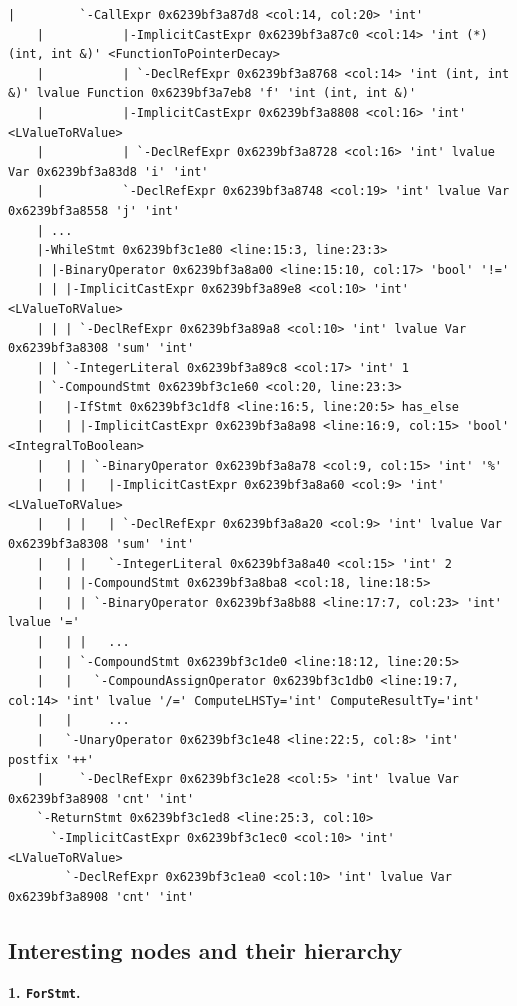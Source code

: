 \documentclass[11pt,a4paper]{article}
\begin{document}
\begin{Verbatim}[fontsize=\scriptsize, frame=single, breaklines, breakanywhere, breakindent=4em, breaksymbolleft={}]
    |         `-CallExpr 0x6239bf3a87d8 <col:14, col:20> 'int'
    |           |-ImplicitCastExpr 0x6239bf3a87c0 <col:14> 'int (*)(int, int &)' <FunctionToPointerDecay>
    |           | `-DeclRefExpr 0x6239bf3a8768 <col:14> 'int (int, int &)' lvalue Function 0x6239bf3a7eb8 'f' 'int (int, int &)'
    |           |-ImplicitCastExpr 0x6239bf3a8808 <col:16> 'int' <LValueToRValue>
    |           | `-DeclRefExpr 0x6239bf3a8728 <col:16> 'int' lvalue Var 0x6239bf3a83d8 'i' 'int'
    |           `-DeclRefExpr 0x6239bf3a8748 <col:19> 'int' lvalue Var 0x6239bf3a8558 'j' 'int'
    | ...
    |-WhileStmt 0x6239bf3c1e80 <line:15:3, line:23:3>
    | |-BinaryOperator 0x6239bf3a8a00 <line:15:10, col:17> 'bool' '!='
    | | |-ImplicitCastExpr 0x6239bf3a89e8 <col:10> 'int' <LValueToRValue>
    | | | `-DeclRefExpr 0x6239bf3a89a8 <col:10> 'int' lvalue Var 0x6239bf3a8308 'sum' 'int'
    | | `-IntegerLiteral 0x6239bf3a89c8 <col:17> 'int' 1
    | `-CompoundStmt 0x6239bf3c1e60 <col:20, line:23:3>
    |   |-IfStmt 0x6239bf3c1df8 <line:16:5, line:20:5> has_else
    |   | |-ImplicitCastExpr 0x6239bf3a8a98 <line:16:9, col:15> 'bool' <IntegralToBoolean>
    |   | | `-BinaryOperator 0x6239bf3a8a78 <col:9, col:15> 'int' '%'
    |   | |   |-ImplicitCastExpr 0x6239bf3a8a60 <col:9> 'int' <LValueToRValue>
    |   | |   | `-DeclRefExpr 0x6239bf3a8a20 <col:9> 'int' lvalue Var 0x6239bf3a8308 'sum' 'int'
    |   | |   `-IntegerLiteral 0x6239bf3a8a40 <col:15> 'int' 2
    |   | |-CompoundStmt 0x6239bf3a8ba8 <col:18, line:18:5>
    |   | | `-BinaryOperator 0x6239bf3a8b88 <line:17:7, col:23> 'int' lvalue '='
    |   | |   ...
    |   | `-CompoundStmt 0x6239bf3c1de0 <line:18:12, line:20:5>
    |   |   `-CompoundAssignOperator 0x6239bf3c1db0 <line:19:7, col:14> 'int' lvalue '/=' ComputeLHSTy='int' ComputeResultTy='int'
    |   |     ...
    |   `-UnaryOperator 0x6239bf3c1e48 <line:22:5, col:8> 'int' postfix '++'
    |     `-DeclRefExpr 0x6239bf3c1e28 <col:5> 'int' lvalue Var 0x6239bf3a8908 'cnt' 'int'
    `-ReturnStmt 0x6239bf3c1ed8 <line:25:3, col:10>
      `-ImplicitCastExpr 0x6239bf3c1ec0 <col:10> 'int' <LValueToRValue>
        `-DeclRefExpr 0x6239bf3c1ea0 <col:10> 'int' lvalue Var 0x6239bf3a8908 'cnt' 'int'
\end{Verbatim}

\subsection{Interesting nodes and their hierarchy}

\textbf{1. \texttt{ForStmt}.}
\end{document}
